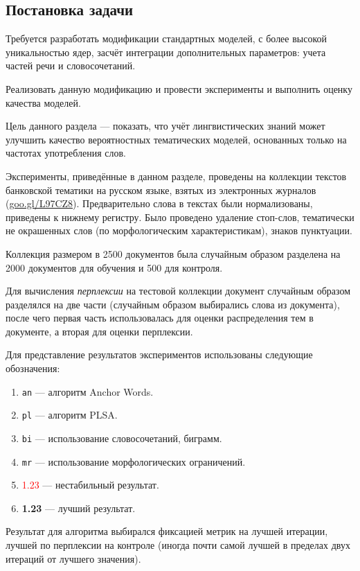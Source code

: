 \documentclass[a4paper, 14pt]{extarticle}
\begin{document}
\subsection{Постановка задачи}

Требуется разработать модификации стандартных моделей, с более высокой уникальностью ядер, засчёт интеграции дополнительных параметров: учета частей речи и словосочетаний. 

Реализовать данную модификацию и провести эксперименты и выполнить оценку качества моделей.


Цель данного раздела --- показать, что учёт лингвистических знаний может улучшить качество вероятностных тематических моделей, основанных только на частотах употребления слов.

Эксперименты, приведённые в данном разделе, проведены на коллекции текстов банковской тематики на русском языке, взятых из электронных журналов~ (\href{https://goo.gl/L97CZ8}{goo.gl/L97CZ8}). Предварительно слова в текстах были нормализованы, приведены к нижнему регистру. Было проведено удаление стоп-слов, тематически не окрашенных слов (по морфологическим характеристикам), знаков пунктуации.

Коллекция размером в 2500 документов была случайным образом разделена на 2000 документов для обучения и 500 для контроля.

Для вычисления \emph{перплексии} на тестовой коллекции документ случайным образом разделялся на две части (случайным образом выбирались слова из документа), после чего первая часть использовалась для оценки распределения тем в документе, а вторая для оценки перплексии.

Для представление результатов экспериментов использованы следующие обозначения:
\begin{enumerate}
	\item \texttt{an} --- алгоритм Anchor Words.
	\item \texttt{pl} --- алгоритм PLSA.
	\item \texttt{bi} --- использование словосочетаний, биграмм.
	\item \texttt{mr} --- использование морфологических ограничений.
	\item \textcolor{red}{1.23} --- нестабильный результат.
	\item \textbf{1.23} --- лучший результат.
\end{enumerate}

Результат для алгоритма выбирался фиксацией метрик на лучшей итерации, лучшей по перплексии на контроле (иногда почти самой лучшей в пределах двух итераций от лучшего значения).
\end{document}

